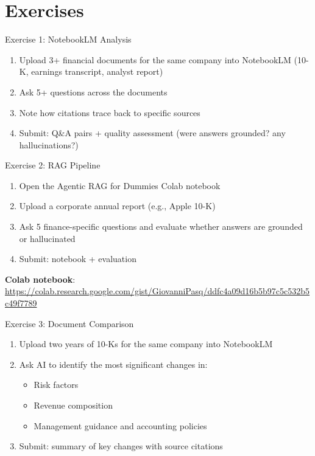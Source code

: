 \documentclass[aspectratio=169]{beamer}
\begin{document}
\section{Exercises}

\begin{frame}{Exercise 1: NotebookLM Analysis}
\begin{enumerate}
  \item Upload 3+ financial documents for the same company into NotebookLM (10-K, earnings transcript, analyst report)
  \item Ask 5+ questions across the documents
  \item Note how citations trace back to specific sources
  \item Submit: Q\&A pairs + quality assessment (were answers grounded? any hallucinations?)
\end{enumerate}
\end{frame}

\begin{frame}{Exercise 2: RAG Pipeline}
\begin{enumerate}
  \item Open the Agentic RAG for Dummies Colab notebook
  \item Upload a corporate annual report (e.g., Apple 10-K)
  \item Ask 5 finance-specific questions and evaluate whether answers are grounded or hallucinated
  \item Submit: notebook + evaluation
\end{enumerate}
\vspace{0.3cm}
\small\textbf{Colab notebook}: \url{https://colab.research.google.com/gist/GiovanniPasq/ddfc4a09d16b5b97c5c532b5c49f7789}
\end{frame}

\begin{frame}{Exercise 3: Document Comparison}
\begin{enumerate}
  \item Upload two years of 10-Ks for the same company into NotebookLM
  \item Ask AI to identify the most significant changes in:
  \begin{itemize}\small
    \item Risk factors
    \item Revenue composition
    \item Management guidance and accounting policies
  \end{itemize}
  \item Submit: summary of key changes with source citations
\end{enumerate}
\end{frame}
\end{document}
